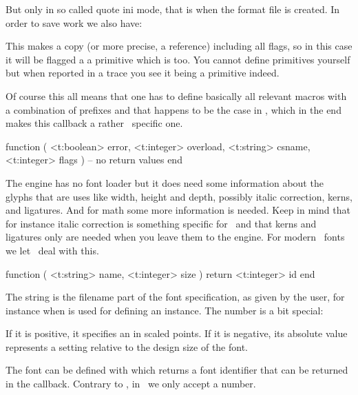 \protected{}
\stoptyping

But only in so called quote {ini} mode, that is when the format file is created. In order to
save work we also have:

\starttyping
\aliased\let\foo\relax
\stoptyping

This makes \type {\foo} a copy (or more precise, a reference) including all
flags, so in this case it will be flagged a a primitive which is \type
{\permanent} too. You cannot define primitives yourself but when reported in a
trace you see it being a primitive indeed.

Of course this all means that one has to define basically all relevant macros
with a combination of prefixes and that happens to be the case in \CONTEXT, which
in the end makes this callback a rather \CONTEXT\ specific one.

\starttyping[option=LUA]
function (
    <t:boolean> error,
    <t:integer> overload,
    <t:string>  csname,
    <t:integer> flags
)
    -- no return values
end
\stoptyping

\stopsubsection

\stopsection

\startsection[title=Fonts]

\startsubsection[title=define_font]

The engine has no font loader but it does need some information about the glyphs
that are uses like width, height and depth, possibly italic correction, kerns,
and ligatures. And for math some more information is needed. Keep in mind that
for instance italic correction is something specific for \TEX\ and that kerns and
ligatures only are needed when you leave them to the engine. For modern \OPENTYPE\ fonts
we let \LUA\ deal with this.

\starttyping[option=LUA]
function (
    <t:string>  name,
    <t:integer> size
)
    return <t:integer> id
end
\stoptyping

The string  is the filename part of the font specification, as given
by the user, for instance when \type {\font} is used for defining an instance.
The number  is a bit special:

\startitemize[packed]
\startitem
    If it is positive, it specifies an  in scaled points.
\stopitem
\startitem
    If it is negative, its absolute value represents a  setting
    relative to the design size of the font.
\stopitem
\stopitemize

The font can be defined with  which returns a font identifier
that can be returned in the callback. Contrary to \LUATEX, in \LUAMETATEX\
we only accept a number.


